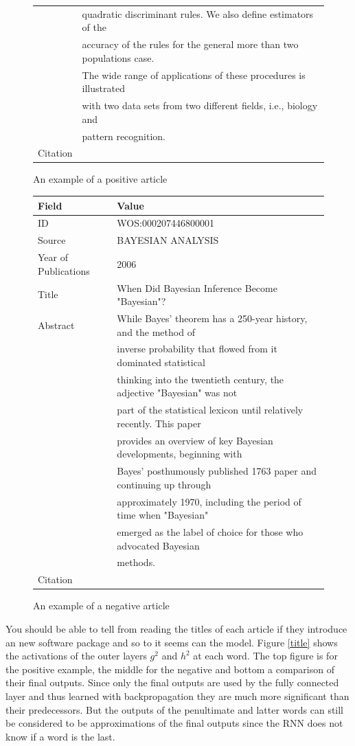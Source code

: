 \documentclass[12pt, a4paper]{article}
\begin{document}
\begin{figure}[H]
\begin{tabular}{ll}
		&quadratic discriminant rules. We also define estimators of the\\
		&accuracy of the rules for the general more than two populations case.\\
		&The wide range of applications of these procedures is illustrated\\
		&with two data sets from two different fields, i.e., biology and\\
		&pattern recognition. \\
		Citation &\cite{conde2015dawai}\\
		\bottomrule
	\end{tabular}
\caption{An example of a positive article}\label{Pos}
\end{figure}


\begin{figure}[H]
	\begin{tabular}{ll}
		\toprule
		Field & Value\\
		\midrule
		ID & WOS:000207446800001 \\
		Source & BAYESIAN ANALYSIS \\
		Year of Publications & 2006 \\
		Title & When Did Bayesian Inference Become "Bayesian"? \\
		Abstract &  While Bayes' theorem has a 250-year history, and the method of\\
		&inverse probability that flowed from it dominated statistical\\
		&thinking into the twentieth century, the adjective "Bayesian" was not\\
		&part of the statistical lexicon until relatively recently. This paper\\
		&provides an overview of key Bayesian developments, beginning with\\
		&Bayes' posthumously published 1763 paper and continuing up through\\
		&approximately 1970, including the period of time when "Bayesian"\\
		&emerged as the label of choice for those who advocated Bayesian\\
		&methods. \\
		Citation &\cite{fienberg2006did}\\
		\bottomrule
	\end{tabular}
	\caption{An example of a negative article}\label{Neg}
\end{figure}

You should be able to tell from reading the titles of each article if they introduce an new software package and so to it seems can the model. Figure \ref{title} shows the activations of the outer layers $g^2$ and $h^2$ at each word. The top figure is for the positive example, the middle for the negative and bottom a comparison of their final outputs. Since only the final outputs are used by the fully connected layer and thus learned with backpropagation they are much more significant than their predecessors. But the outputs of the penultimate and latter words can still be considered to be approximations of the final outputs since the RNN does not know if a word is the last.
\end{document}
